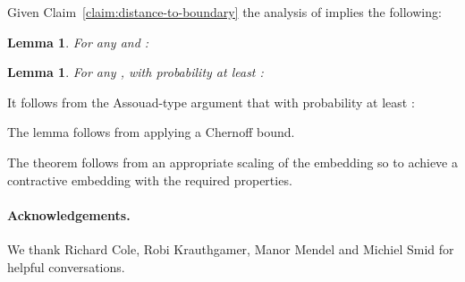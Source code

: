 \documentclass[11pt]{article}
\newtheorem{lemma}[theorem]{Lemma}
\newenvironment{proof}{{\bf Proof:\ }}{\hfill\medskip}
\begin{document}
Given Claim~\ref{claim:distance-to-boundary} the analysis of
\cite{AbBaNe08} implies the following:

\begin{lemma}
\label{lemma:embedding-upper-assouad} For any  and
:

\end{lemma}

\begin{lemma}
\label{lemma:embedding-lower-assouad} For any , with
probability at least :

\end{lemma}
\begin{proof}
It follows from the Assouad-type argument that with probability at
least :

The lemma follows from applying a Chernoff bound.
\end{proof}

The theorem follows from an appropriate scaling of the embedding
so to achieve a contractive embedding with the required
properties.


\paragraph{Acknowledgements.} We thank Richard Cole, Robi Krauthgamer,
Manor Mendel and Michiel Smid for helpful conversations.



\end{document}
